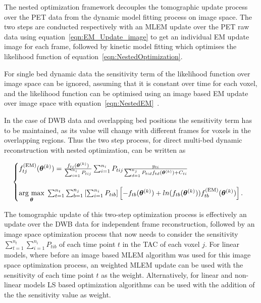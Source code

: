 The nested optimization framework decouples the tomographic update process over the PET data from the dynamic model fitting process on image space. The two steps are conducted respectively with an MLEM update over the PET raw data using equation~\ref{eqn:EM_Update_image} to get an individual EM update image for each frame, followed by kinetic model fitting which optimises the likelihood function of equation~\ref{eqn:NestedOptimization}. 

For single bed dynamic data the sensitivity term of the likelihood function over image space can be ignored, assuming that it is constant over time for each voxel, and the likelihood function can be optimised using an image based EM update over image space with equation~\ref{eqn:NestedEM}~\cite{Wang2010,Reader2014}.

In the case of DWB data and overlapping bed positions the sensitivity term has to be maintained, as its value will change with different frames for voxels in the overlapping regions.
Thus the two step process, for direct multi-bed dynamic reconstruction with nested optimization, can be written as

\begin{equation}
\label{eq3_3:NestedMultibed}
\text{}
\begin{cases}  
f_{tj}^{(\textrm{EM})}(\bm\theta^{(k)}) = \frac{f_{tj}(\bm\theta^{(k)})}{\sum_{i=1}^{n_i} P_{tij}} 
\sum_{i=1}^{n_i} P_{tij} 
\frac{y_{ti}}{\sum_{d=1}^{n_j} P_{tid} f_{td}(\bm\theta^{(k)}) + C_{ti} } \\ \\
\underset{\bm{\theta}}{\operatorname{arg}\,\operatorname{max}}\; 
\sum_{t=1}^{n_t} \sum_{b=1}^{n_j} \left[ \sum_{i=1}^{n_i}  P_{tib} \right]
\left[ -f_{tb}(\bm\theta^{(k)}) + 
ln( f_{tb}(\bm\theta^{(k)})) 
f_{tb}^{(\mathrm{EM})}(\bm{\theta}^{(k)})
\right] .\\
\end{cases}
\end{equation}

The tomographic update of this two-step optimization process is effectively an update over the DWB data for independent frame reconstruction, followed by an image space optimization process that now needs to consider the sensitivity $\sum_{t=1}^{n_t} \sum_{i=1}^{n_i}  P_{tib}$ of each time point $t$ in the TAC of each voxel $j$. For linear models, where before an image based MLEM algorithm was used for this image space optimization process, an weighted MLEM update can be used with the sensitivity of each time point $t$ as the weight. Alternatively, for linear and non-linear models LS based optimization algorithms can be used with the addition of the the sensitivity value as weight.
%

%

